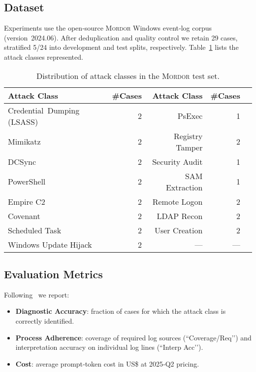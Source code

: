 \documentclass[10pt,conference]{IEEEtran}
\begin{document}
\subsection{Dataset}
Experiments use the open‑source \textsc{Mordor} Windows event‑log corpus
(version~2024.06).  
After deduplication and quality control we retain 29 cases, stratified 5/24
into development and test splits, respectively.  
Table~\ref{tab:attack_types} lists the attack classes represented.

\begin{table}[ht]
\centering
\caption{Distribution of attack classes in the \textsc{Mordor} test set.}
\label{tab:attack_types}
\begin{tabular}{lrrrr}
\toprule
\textbf{Attack Class} & \textbf{\#Cases} &
\textbf{Attack Class} & \textbf{\#Cases}\\
\midrule
Credential~Dumping (LSASS) & 2 & PsExec          & 1\\
Mimikatz                  & 2 & Registry Tamper & 2\\
DCSync                    & 2 & Security Audit   & 1\\
PowerShell                & 2 & SAM Extraction   & 1\\
Empire C2                 & 2 & Remote Logon     & 2\\
Covenant                  & 2 & LDAP Recon       & 2\\
Scheduled Task            & 2 & User Creation    & 2\\
Windows Update Hijack     & 2 & ---              & ---\\
\bottomrule
\end{tabular}
\end{table}

\subsection{Evaluation Metrics}
Following~\cite{clinical_paradox_2025} we report:
\begin{itemize}
  \item \textbf{Diagnostic Accuracy}: fraction of cases for which the attack
        class is correctly identified.
  \item \textbf{Process Adherence}: coverage of required log sources
        (``Coverage/Req’’) and interpretation accuracy on individual log lines
        (``Interp Acc’’).
  \item \textbf{Cost}: average prompt‑token cost in US\$ at 2025‑Q2 pricing.
\end{itemize}
\end{document}
